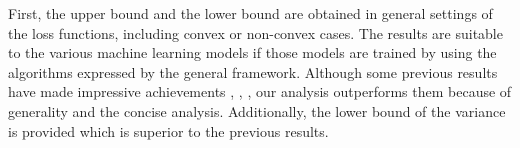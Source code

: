 \documentclass[letterpaper]{article}
\begin{document}

First, the upper bound and the lower bound are obtained in general settings of the loss functions, including convex or non-convex cases. The results are suitable to the various machine learning models if those models are trained by using the algorithms expressed by the general framework. Although some previous results  have made  impressive achievements \cite{ShalevShwartz:2016vy}, \cite{Garber:2015td}, \cite{AllenZhu:2016up}, our analysis outperforms them because of generality and the concise analysis. Additionally, the lower bound of the variance is provided which is superior to the previous results.
\end{document}
